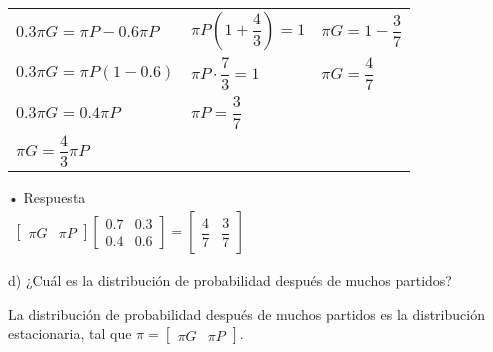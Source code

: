 \documentclass[a4paper, 12pt]{article}
\newcommand{\Aspace}{0.2cm}
\begin{document}
\begin{enumerate}
{\begin{flushleft}
\begin{tabular}{p{5cm} p{5cm} p{5cm}}
                        $0{.}3 \pi G = \pi P - 0{.}6 \pi P$ &
                        $\pi P (1 + \dfrac{4}{3}) = 1$ &
                        $\pi G = 1 - \dfrac{3}{7}$ \\

                        $0{.}3 \pi G = \pi P (1 - 0{.}6)$ &
                        $\pi P \cdot \dfrac{7}{3} = 1$ &
                        $\pi G = \dfrac{4}{7}$ \\

                        $0{.}3 \pi G = 0{.}4 \pi P$ &
                        $\pi P = \dfrac{3}{7}$ &
                        \\

                        $\pi G = \dfrac{4}{3} \pi P$ &
                        &
                        \\
                    \end{tabular}
                \end{flushleft}

                \newpage
                • Respuesta \\
                \(
                    \begin{array}{cccc}
                        \begin{bmatrix}
                            \pi G   &   \pi P
                        \end{bmatrix}
                    
                        \begin{bmatrix}
                            0{.}7   &   0{.}3   \\
                            0{.}4   &   0{.}6
                        \end{bmatrix}

                        =

                        \begin{bmatrix}
                            \dfrac{4}{7}    &   \dfrac{3}{7}
                        \end{bmatrix}                   
                    \end{array}
                \)
            }
            
            

            \vspace{\Aspace} \par
            d) ¿Cuál es la distribución de probabilidad después de muchos partidos?
            \\ { \color{azul} 
                La distribución de probabilidad después de muchos partidos es la distribución estacionaria, tal que 
                \( \pi = 
                    \begin{bmatrix} 
                        \pi G   &   \pi P 
                    \end{bmatrix} 
                \).

}
\end{enumerate}
\end{document}
